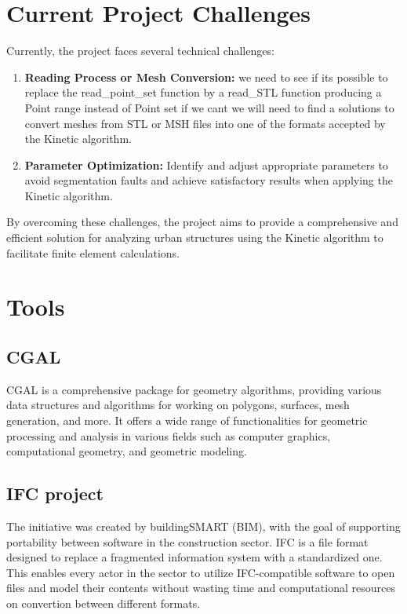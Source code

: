 \documentclass{article}
\begin{document}
\section{Current Project Challenges}

Currently, the project faces several technical challenges:

\begin{enumerate}
    \item \textbf{Reading Process or Mesh Conversion:} we need to see if its possible to replace the read\_point\_set function by a read\_STL
    function producing a Point range instead of Point set if we cant we will need to find a
    solutions to convert meshes from STL or MSH files into one of the formats accepted by the Kinetic algorithm.
    
    \item \textbf{Parameter Optimization:} Identify and adjust appropriate 
    parameters to avoid segmentation faults and achieve satisfactory results 
    when applying the Kinetic algorithm.
\end{enumerate}

By overcoming these challenges, the project aims to provide a 
comprehensive and efficient solution for analyzing urban structures 
using the Kinetic algorithm to facilitate finite element calculations.\newline

\section{Tools}
\subsection{CGAL}
CGAL is a comprehensive package for geometry algorithms, providing various data structures and algorithms for working on polygons, surfaces, mesh generation, and more.
It offers a wide range of functionalities for geometric processing and analysis in various fields such as computer graphics, computational geometry, and geometric modeling.
\subsection{IFC project}

The initiative was created by buildingSMART (BIM), with the goal of supporting portability between software in the construction sector.
 IFC is a file format designed to replace a fragmented information system with a standardized one.
  This enables every actor in the sector to utilize IFC-compatible software to open files and model their contents without wasting time and computational resources on convertion between different formats.
\end{document}

